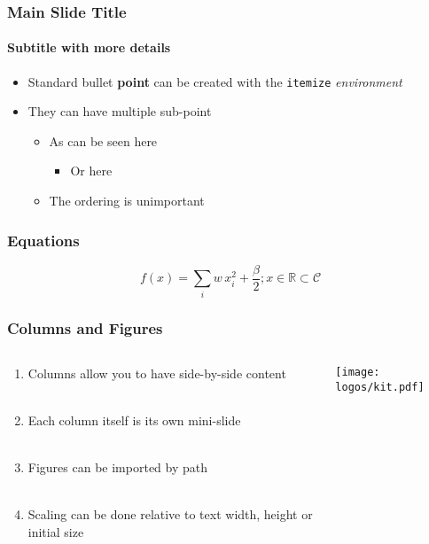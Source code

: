 \documentclass[aspectratio=1610]{beamer}
\begin{document}
\begin{frame}
    \frametitle{Main Slide Title}
    \framesubtitle{Subtitle with more details}

    \begin{itemize}
        \item Standard bullet \textbf{point} can be created with the \texttt{itemize} \textit{environment}
        \item They can have multiple sub-point
        \begin{itemize}
            \item As can be seen here
            \begin{itemize}
                \item Or here
            \end{itemize}
            \item The ordering is unimportant
        \end{itemize}
    \end{itemize}
\end{frame}


\begin{frame}
\frametitle{Equations}

    \begin{equation*}
        f(x) = \sum_i w\,x_i^2 + \frac{\beta}{2}; x\in\mathbb R\subset \mathcal C
    \end{equation*}
\end{frame}


\begin{frame}
    \frametitle{Columns and Figures}

    \begin{columns}
        \begin{column}{0.4\textwidth}
            \begin{enumerate}
                \item Columns allow you to have side-by-side content\\~
                \item Each column itself is its own mini-slide\\~
                \item Figures can be imported by path\\~
                \item Scaling can be done relative to text width, height or initial size
            \end{enumerate}
        \end{column}
        \begin{column}{0.4\textwidth}
            \centering
            \texttt{[image: logos/kit.pdf]}
        \end{column}
    \end{columns}
\end{frame}
\end{document}
